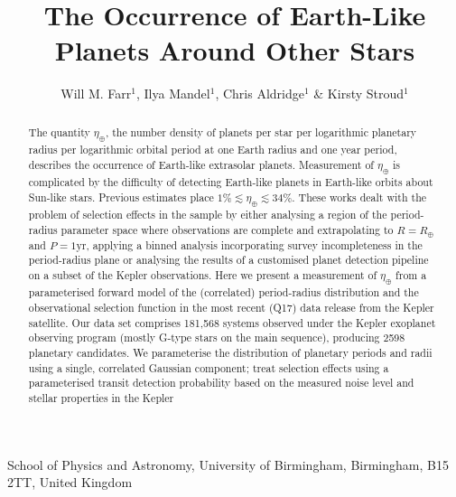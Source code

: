 \documentclass{nature}
\newcommand{\etaearth}{\eta_\oplus}
\newcommand{\REarth}{R_\oplus}
\begin{document}
\title{The Occurrence of Earth-Like Planets Around Other Stars}

\author{Will M. Farr$^{1}$, Ilya Mandel$^{1}$, Chris Aldridge$^{1}$ \& Kirsty Stroud$^{1}$}

\maketitle

\begin{affiliations}
\item School of Physics and Astronomy, University of Birmingham, Birmingham, B15 2TT, United Kingdom
\end{affiliations}

\begin{abstract}
  The quantity $\etaearth$, the number density of planets per star per
  logarithmic planetary radius per logarithmic orbital period at one
  Earth radius and one year period, describes the occurrence of
  Earth-like extrasolar planets.  Measurement of $\etaearth$ is
  complicated by the difficulty of detecting Earth-like planets in
  Earth-like orbits about Sun-like stars.  Previous
  estimates\cite{Catanzarite2011,Traub2012,Dong2013,Petigura2013,Foreman-Mackey2014}
  place $1\% \lesssim \etaearth \lesssim 34\%$.  These works dealt
  with the problem of selection effects in the sample by either
  analysing a region of the period-radius parameter space where
  observations are complete and extrapolating to $R = \REarth$ and $P
  = 1 \mathrm{yr}$\cite{Catanzarite2011,Traub2012}, applying a binned
  analysis incorporating survey incompleteness in the period-radius
  plane\cite{Dong2013,Petigura2013} or analysing the results of a
  customised planet detection pipeline on a subset of the Kepler
  observations\cite{Petigura2013,Foreman-Mackey2014}.  Here we present
  a measurement of $\etaearth$ from a parameterised forward model of the
  (correlated) period-radius distribution and the observational
  selection function in the most recent (Q17) data release from the
  Kepler satellite\cite{Borucki2010,Borucki2011,Batalha2013}.  Our
  data set comprises 181,568 systems observed under the Kepler
  exoplanet observing program (mostly G-type stars on the main
  sequence\cite{Batalha2010}), producing 2598 planetary candidates.
  We parameterise the distribution of planetary periods and radii
  using a single, correlated Gaussian component; treat selection
  effects using a parameterised transit detection probability based on
  the measured noise level and stellar properties in the Kepler

\end{abstract}
\end{document}
